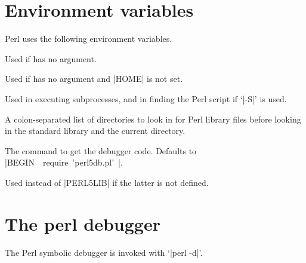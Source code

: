 \documentclass{refbase}
\begin{document}
\section{Environment variables} 

Perl uses the following environment variables.

\begin{enum}{1.5cm}

Used if  has no argument.

Used if  has no argument and |HOME| is not set.

Used in executing subprocesses, and in finding the Perl script if `|-S|'
is used.

A colon-separated list of directories to look in for Perl library files
before looking in the standard library and the current directory.

The command to get the debugger code.
\newline Defaults to \hbox{|BEGIN { require 'perl5db.pl' }|}. 

Used instead of |PERL5LIB| if the latter is not defined.

\end{enum}


\section{The perl debugger} 

The Perl symbolic debugger is invoked with `|perl -d|'.
\end{document}
